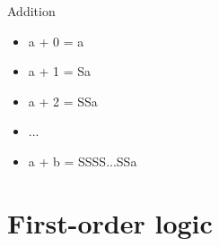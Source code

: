 \documentclass[utf8]{beamer}
\begin{document}
\begin{frame}{Addition}
\begin{itemize}
\item a + 0 = a
\item a + 1 = Sa
\item a + 2 = SSa
\item ...
\item a + b = SSSS...SSa
\end{itemize}
\end{frame}

\part{First-order logic}
\begin{frame}
\partpage
\end{frame}
\end{document}
